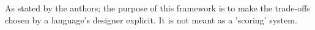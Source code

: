 As stated by the authors; the purpose of this framework is to make the trade-offs chosen by a language's designer explicit. It is not meant as a 'scoring' system.


















